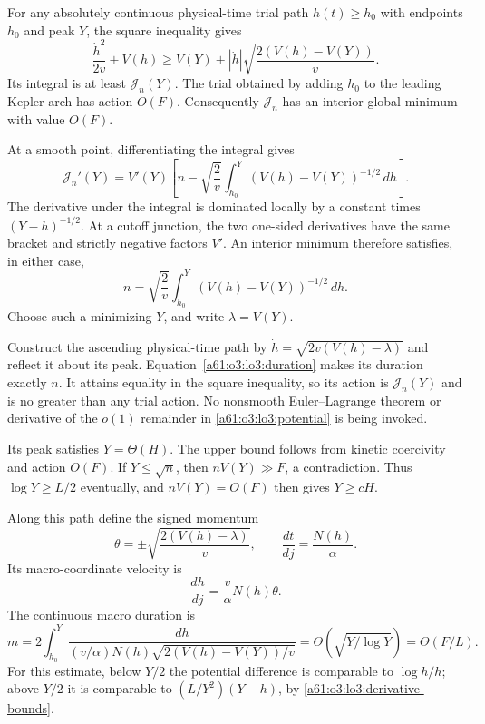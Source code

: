 \documentclass[11pt,letterpaper]{article}
\numberwithin{equation}{section}
\theoremstyle{remark}\newtheorem{remark}[theorem]{Remark}
\begin{document}
For any absolutely continuous physical-time trial path $h(t)\ge h_0$
with endpoints $h_0$ and peak $Y$, the square inequality gives
\[
 \frac{\dot h^2}{2v}+V(h)
 \ge V(Y)+|\dot h|\sqrt{\frac{2(V(h)-V(Y))}{v}}.
\]
Its integral is at least $\mathcal J_n(Y)$. The trial obtained by
adding $h_0$ to the leading Kepler arch has action $O(F)$.
Consequently $\mathcal J_n$ has an interior global minimum with
value $O(F)$.

At a smooth point, differentiating the integral gives
\[
 \mathcal J_n'(Y)=V'(Y)
 \left[n-\sqrt{\frac2v}\int_{h_0}^Y
                       (V(h)-V(Y))^{-1/2}\,dh\right].
\]
The derivative under the integral is dominated locally by a constant
times $(Y-h)^{-1/2}$. At a cutoff junction, the two one-sided
derivatives have the same bracket and strictly negative factors
$V'$. An interior minimum therefore satisfies, in either case,
\begin{equation}\label{a61:o3:lo3:duration}
 n=\sqrt{\frac2v}\int_{h_0}^Y(V(h)-V(Y))^{-1/2}\,dh.
\end{equation}
Choose such a minimizing $Y$, and write $\lambda=V(Y)$.

Construct the ascending physical-time path by
$\dot h=\sqrt{2v(V(h)-\lambda)}$ and reflect it about its peak.
Equation~\eqref{a61:o3:lo3:duration} makes its duration exactly $n$.
It attains equality in the square inequality, so its action is
$\mathcal J_n(Y)$ and is no greater than any trial action.
No nonsmooth Euler--Lagrange theorem or derivative of the $o(1)$
remainder in \eqref{a61:o3:lo3:potential} is being invoked.

Its peak satisfies $Y=\Theta(H)$. The upper bound follows from
kinetic coercivity and action $O(F)$. If $Y\le\sqrt n$, then
$nV(Y)\gg F$, a contradiction. Thus $\log Y\ge L/2$ eventually,
and $nV(Y)=O(F)$ then gives $Y\ge cH$.

Along this path define the signed momentum
\[
 \theta=\pm\sqrt{\frac{2(V(h)-\lambda)}v},
 \qquad \frac{dt}{dj}=\frac{N(h)}\alpha.
\]
Its macro-coordinate velocity is
\begin{equation}\label{a61:o3:lo3:macro-flow}
 \frac{dh}{dj}=\frac v\alpha N(h)\theta.
\end{equation}
The continuous macro duration is
\[
 m=2\int_{h_0}^Y
 \frac{dh}{(v/\alpha)N(h)\sqrt{2(V(h)-V(Y))/v}}
 =\Theta\!\left(\sqrt{Y/\log Y}\right)=\Theta(F/L).
\]
For this estimate, below $Y/2$ the potential difference is comparable
to $\log h/h$; above $Y/2$ it is comparable to
$(L/Y^2)(Y-h)$, by \eqref{a61:o3:lo3:derivative-bounds}.
\end{document}
